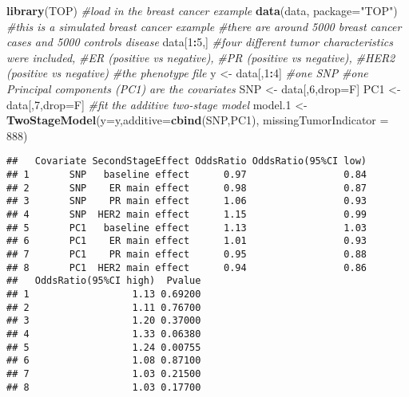 \documentclass[11pt,]{article}
\newenvironment{Shaded}{\begin{snugshade}}{\end{snugshade}}
\newcommand{\KeywordTok}[1]{\textcolor[rgb]{0.13,0.29,0.53}{\textbf{#1}}}
\newcommand{\DataTypeTok}[1]{\textcolor[rgb]{0.13,0.29,0.53}{#1}}
\newcommand{\DecValTok}[1]{\textcolor[rgb]{0.00,0.00,0.81}{#1}}
\newcommand{\StringTok}[1]{\textcolor[rgb]{0.31,0.60,0.02}{#1}}
\newcommand{\CommentTok}[1]{\textcolor[rgb]{0.56,0.35,0.01}{\textit{#1}}}
\newcommand{\OperatorTok}[1]{\textcolor[rgb]{0.81,0.36,0.00}{\textbf{#1}}}
\newcommand{\NormalTok}[1]{#1}
\begin{document}
\begin{Shaded}
\begin{Highlighting}[]
\KeywordTok{library}\NormalTok{(TOP)}
\CommentTok{#load in the breast cancer example}
\KeywordTok{data}\NormalTok{(data, }\DataTypeTok{package=}\StringTok{"TOP"}\NormalTok{)}
\CommentTok{#this is a simulated breast cancer example}
\CommentTok{#there are around 5000 breast cancer cases and 5000 controls disease}
\NormalTok{data[}\DecValTok{1}\OperatorTok{:}\DecValTok{5}\NormalTok{,]}
\CommentTok{#four different tumor characteristics were included, }
\CommentTok{#ER (positive vs negative), }
\CommentTok{#PR (positive vs negative),}
\CommentTok{#HER2 (positive vs negative)}
\CommentTok{#the phenotype file}
\NormalTok{y <-}\StringTok{ }\NormalTok{data[,}\DecValTok{1}\OperatorTok{:}\DecValTok{4}\NormalTok{]}
\CommentTok{#one SNP}
\CommentTok{#one Principal components (PC1) are the covariates}
\NormalTok{SNP <-}\StringTok{ }\NormalTok{data[,}\DecValTok{6}\NormalTok{,drop=F]}
\NormalTok{PC1 <-}\StringTok{ }\NormalTok{data[,}\DecValTok{7}\NormalTok{,drop=F]}
\CommentTok{#fit the additive two-stage model}
\NormalTok{model.}\DecValTok{1}\NormalTok{ <-}\StringTok{ }\KeywordTok{TwoStageModel}\NormalTok{(}\DataTypeTok{y=}\NormalTok{y,}\DataTypeTok{additive=}\KeywordTok{cbind}\NormalTok{(SNP,PC1),}
                         \DataTypeTok{missingTumorIndicator =} \DecValTok{888}\NormalTok{)}
\end{Highlighting}
\end{Shaded}

\begin{Shaded}
\end{Shaded}

\begin{verbatim}
##   Covariate SecondStageEffect OddsRatio OddsRatio(95%CI low)
## 1       SNP   baseline effect      0.97                 0.84
## 2       SNP    ER main effect      0.98                 0.87
## 3       SNP    PR main effect      1.06                 0.93
## 4       SNP  HER2 main effect      1.15                 0.99
## 5       PC1   baseline effect      1.13                 1.03
## 6       PC1    ER main effect      1.01                 0.93
## 7       PC1    PR main effect      0.95                 0.88
## 8       PC1  HER2 main effect      0.94                 0.86
##   OddsRatio(95%CI high)  Pvalue
## 1                  1.13 0.69200
## 2                  1.11 0.76700
## 3                  1.20 0.37000
## 4                  1.33 0.06380
## 5                  1.24 0.00755
## 6                  1.08 0.87100
## 7                  1.03 0.21500
## 8                  1.03 0.17700
\end{verbatim}
\end{document}
